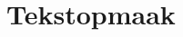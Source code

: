 \documentclass[../presentatie.tex]{subfiles}
\begin{document}
	\section{Tekstopmaak}
	\clearrecentlist
	
	
	
	
	
\end{document}

